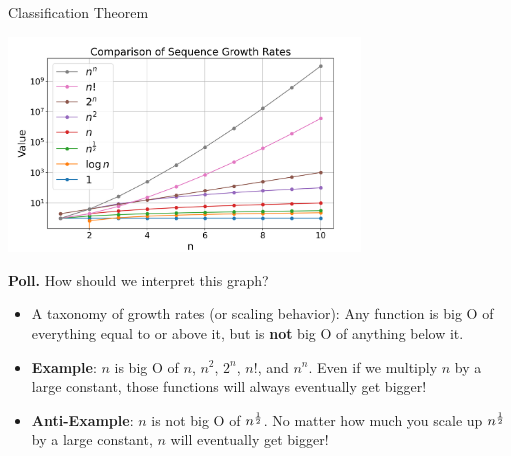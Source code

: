 \documentclass[10pt]{beamer}
\begin{document}
\begin{frame}{Classification Theorem}
\footnotesize 
\begin{center}
\includegraphics[width=0.7\textwidth]{images/classification_theorem.png}
\end{center}
\vfill 
\colorbox{yellow!30}{\textbf{Poll.}} How should we interpret this graph?
\vfill \pause 
\begin{itemize}
\item A taxonomy of growth rates (or scaling behavior): Any function is big O of everything equal to or above it, but is \textbf{not} big O of anything below it. \pause 
\item \textbf{Example}:  \colorbox{red!30}{$n$} is big O of \colorbox{red!30}{$n$}, \colorbox{purple!30}{$n^2$}, \colorbox{brown!30}{$2^n$}, \colorbox{pink!30}{$n!$}, and \colorbox{gray!30}{$n^n$}.  Even if we multiply  \colorbox{red!30}{$n$}  by a large constant, those functions will always eventually get bigger! \pause 
\item \textbf{Anti-Example}:  \colorbox{red!30}{$n$} is not big O of \colorbox{green!30}{$n^{\frac{1}{2}}$}.  No matter how much you scale up \colorbox{green!30}{$n^{\frac{1}{2}}$} by a large constant,  \colorbox{red!30}{$n$} will eventually get bigger!
\end{itemize}

\end{frame}
\end{document}
